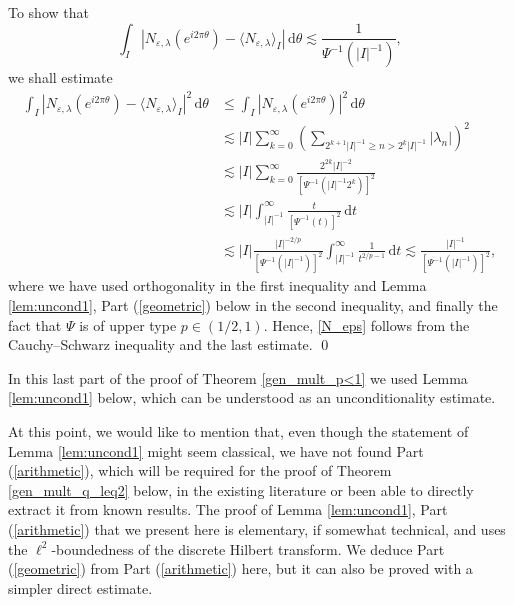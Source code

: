 \documentclass[a4paper, leqno, 10pt]{amsart}
\numberwithin{equation}{section}
\newcommand{\dd}{\mathrm{d}}
\newcommand{\eps}{\varepsilon}
\begin{document}
To show that 
\begin{equation}\label{N_eps}
\int_I \left| N_{\eps, \lambda}(e^{i 2 \pi \theta}) - \langle N_{\eps, \lambda} \rangle_I \right| \, \dd  \theta 
\lesssim \frac{1}{\Psi^{-1}( |I|^{-1})},
\end{equation}
we shall estimate
\begin{align*} 
\int_I \left| N_{\eps, \lambda}(e^{i 2 \pi \theta}) - \langle N_{\eps, \lambda} \rangle_I \right|^2 \, \dd  \theta
&\leq  \int_I \left| N_{\eps, \lambda}(e^{i 2 \pi \theta}) \right|^2 \, \dd  \theta \\
& \lesssim |I| \sum_{k=0}^{\infty} \left( \sum_{2^{k+1}|I|^{-1} \geq n > 2^k|I|^{-1}} |\lambda_n| \right)^2 \\
& \lesssim |I|\sum_{k=0}^{\infty} \frac{2^{2k} |I|^{-2}}{[\Psi^{-1}(|I|^{-1} 2^k) ]^2  } \\
& \lesssim |I|\int_{|I|^{-1}}^\infty  \frac{t}{[\Psi^{-1}(t)]^2  } \, \dd t \\
& \lesssim |I|\frac{|I|^{-2/p}}{[\Psi^{-1}(|I|^{-1})]^2}  \int_{|I|^{-1}}^\infty  \frac{1}{ t^{2/p -1} } \, \dd t  \lesssim \frac{|I|^{-1}}{[\Psi^{-1}(|I|^{-1})]^2},
\end{align*}
 where we have used orthogonality in the first inequality and Lemma \ref{lem:uncond1}, Part (\ref{geometric}) below in the second inequality, and finally the fact that $\Psi$ is of upper type $p \in (1/2, 1) $.
 Hence, \eqref{N_eps} follows from the Cauchy--Schwarz inequality and the last estimate. \qed
%
%

In  this last part of the proof of Theorem \ref{gen_mult_p<1} we used Lemma \ref{lem:uncond1} below, which can be understood as an unconditionality estimate.

At this point, we would like to mention that, even though the statement of Lemma \ref{lem:uncond1} might seem classical, we have not found Part (\ref{arithmetic}), which will be required for the proof of Theorem \ref{gen_mult_q_leq2} below, in the existing literature or been able to directly extract it from known results. 
%
The proof of Lemma \ref{lem:uncond1}, Part (\ref{arithmetic})  that we present here is elementary, if somewhat technical, and uses the $\ell^2$-boundedness of the discrete Hilbert transform. We deduce Part (\ref{geometric}) from Part (\ref{arithmetic}) here, but it can also be proved with a simpler direct estimate.
\end{document}
